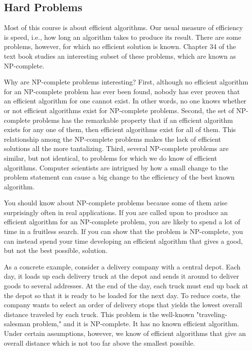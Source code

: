 \documentclass[12pt,a4paper]{book}
\begin{document}
\subsection{Hard Problems}
Most of this course is about efficient algorithms. Our usual measure of efficiency is speed, i.e., how long an algorithm takes to produce its result. There are some problems, however, for which no efficient solution is known. Chapter 34 of the text book studies an interesting subset of these problems, which are known as NP-complete.
\par Why are NP-complete problems interesting? First, although no efficient algorithm for an NP-complete problem has ever been found, nobody has ever proven that an efficient algorithm for one cannot exist. In other words, no one knows whether or not efficient algorithms exist for NP-complete problems. Second, the set of NP-complete problems has the remarkable property that if an efficient algorithm exists for any one of them, then efficient algorithms exist for all of them. This relationship among the NP-complete problems makes the lack of efficient solutions all the more tantalizing. Third, several NP-complete problems are similar, but not identical, to problems for which we do know of efficient algorithms. Computer scientists are intrigued by how a small change to the problem statement can cause a big change to the efficiency of the best known algorithm.
\par You should know about NP-complete problems because some of them arise surprisingly often in real applications. If you are called upon to produce an efficient algorithm for an NP-complete problem, you are likely to spend a lot of time in a fruitless search. If you can show that the problem is NP-complete, you can instead spend your time developing an efficient algorithm that gives a good, but not the best possible, solution.
\par As a concrete example, consider a delivery company with a central depot. Each day, it loads up each delivery truck at the depot and sends it around to deliver goods to several addresses. At the end of the day, each truck must end up back at the depot so that it is ready to be loaded for the next day. To reduce costs, the company wants to select an order of delivery stops that yields the lowest overall distance traveled by each truck. This problem is the well-known "traveling-salesman problem," and it is NP-complete. It has no known efficient algorithm. Under certain assumptions, however, we know of efficient algorithms that give an overall distance which is not too far above the smallest possible. 
\end{document}
